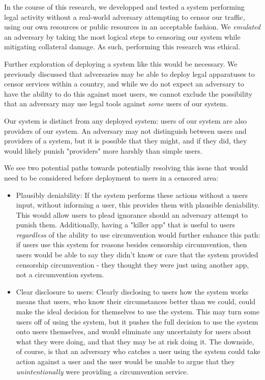 \documentclass[12pt]{report}
\begin{document}
In the course of this research, we developped and tested a system performing legal activity without a real-world adversary attempting to censor our traffic, using our own resources or public resources in an acceptable fashion. We \emph{emulated} an adversary by taking the most logical steps to censoring our system while mitigating collateral damage. As such, performing this research was ethical.

Further exploration of deploying a system like this would be necessary. We previously discussed that adversaries may be able to deploy legal apparatuses to censor services within a country, and while we do not expect an adversary to have the ability to do this against most users, we cannot exclude the possibility that an adversary may use legal tools against \emph{some} users of our system.

Our system is distinct from any deployed system: users of our system are also providers of our system. An adversary may not distinguish between users and providers of a system, but it is possible that they might, and if they did, they would likely punish "providers" more harshly than simple users.

We see two potential paths towards potentially resolving this issue that would need to be considered before deployment to users in a censored area:
\begin{itemize}
  \item Plausibly deniability: If the system performs these actions without a users input, without informing a user, this provides them with plausible deniability. This would allow users to plead ignorance should an adversary attempt to punish them. Additionally, having a "killer app" that is useful to users \emph{regardless} of the ability to use circumvention would further enhance this path: if users use this system for reasons besides censorship circumvention, then users would be able to say they didn't know or care that the system provided censorship circumvention - they thought they were just using another app, not a circumvention system. 
  \item Clear disclosure to users: Clearly disclosing to users how the system works means that users, who know their circumstances better than we could, could make the ideal decision for themselves to use the system. This may turn some users off of using the system, but it pushes the full decision to use the system onto users themselves, and would eliminate any uncertainty for users about what they were doing, and that they may be at risk doing it. The downside, of course, is that an adversary who catches a user using the system could take action against a user and the user would be unable to argue that they \emph{unintentionally} were providing a circumvention service.
\end{itemize}
\end{document}
